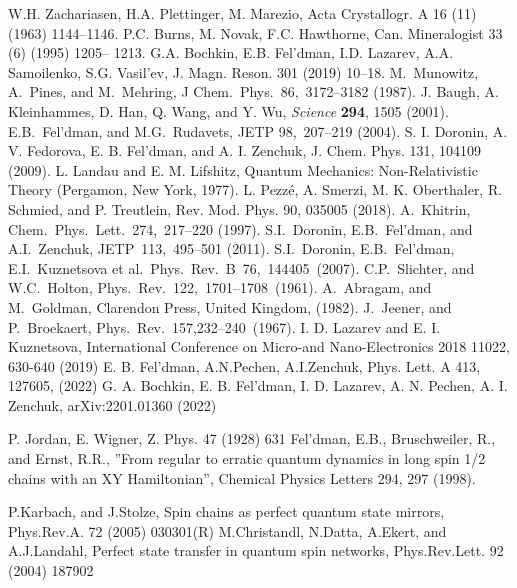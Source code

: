\begin{thebibliography}{}
  W.H. Zachariasen, H.A. Plettinger, M. Marezio, Acta Crystallogr. A 16 (11) (1963) 1144–1146.
  P.C. Burns, M. Novak, F.C. Hawthorne, Can. Mineralogist 33 (6) (1995) 1205– 1213.
  G.A. Bochkin, E.B. Fel’dman, I.D. Lazarev, A.A. Samoilenko, S.G. Vasil’ev, J. Magn. Reson. 301 (2019) 10–18.
   M.~Munowitz, A.~Pines, and M.~Mehring, J Chem.~Phys.~86,~3172–3182 (1987).
 J. Baugh, A. Kleinhammes, D. Han, Q. Wang, and Y. Wu, \textit{Science} \textbf{294}, 1505 (2001).
  E.B.~Fel’dman, and M.G.~Rudavets, JETP 98,~207–219 (2004).
  S. I. Doronin, A. V. Fedorova, E. B. Fel’dman, and A. I. Zenchuk, J. Chem. Phys. 131, 104109 (2009).
  L. Landau and E. M. Lifshitz, Quantum Mechanics: Non-Relativistic Theory (Pergamon, New York, 1977).
  L. Pezz\'e, A. Smerzi, M. K. Oberthaler, R. Schmied, and P. Treutlein, Rev. Mod. Phys. 90, 035005 (2018).
  A.~Khitrin, Chem.~Phys.~Lett.~274,~217–220 (1997).
  S.I.~Doronin, E.B.~Fel’dman, and  A.I.~Zenchuk, JETP~113,~495–501 (2011).
  S.I.~Doronin, E.B.~Fel’dman, E.I.~Kuznetsova et al.~Phys.~Rev.~B~76,~144405~(2007).
  C.P.~Slichter, and  W.C.~Holton, Phys.~Rev.~122,~1701–1708~(1961).
  A.~Abragam, and M.~Goldman, Clarendon Press, United Kingdom, (1982).
  J.~Jeener, and P.~Broekaert, Phys.~Rev.~157,232–240~(1967).
  I. D. Lazarev and  E. I. Kuznetsova, International Conference on Micro-and Nano-Electronics 2018 11022, 630-640 (2019)
  E. B. Fel'dman, A.N.Pechen, A.I.Zenchuk, Phys. Lett. A 413, 127605, (2022)
  G. A. Bochkin, E. B. Fel'dman, I. D. Lazarev, A. N. Pechen, A. I. Zenchuk,  arXiv:2201.01360 (2022)

 P. Jordan, E. Wigner, Z. Phys. 47 (1928) 631
 Fel'dman, E.B., Bruschweiler, R., and Ernst, R.R., ”From regular to erratic quantum dynamics in long
spin 1/2 chains with an XY Hamiltonian”, Chemical Physics Letters 294, 297 (1998).

 P.Karbach, and J.Stolze, Spin chains as perfect quantum state mirrors, Phys.Rev.A. 72 (2005) 030301(R)
 M.Christandl, N.Datta, A.Ekert, and A.J.Landahl, Perfect state transfer in quantum spin networks, Phys.Rev.Lett. 92 (2004) 187902


\end{thebibliography}
